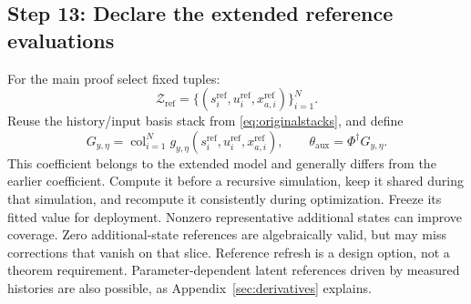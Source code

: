\documentclass[11pt,a4paper]{article}
\newcommand{\col}{\operatorname{col}}
\newcommand{\refset}{\mathrm{ref}}
\begin{document}
\subsection*{Step 13: Declare the extended reference evaluations}
For the main proof select fixed tuples:
\begin{equation}\label{eq:extendedreferences}
\mathcal Z_{\refset}=\{(s_i^{\refset},u_i^{\refset},x_{a,i}^{\refset})\}_{i=1}^N.
\end{equation}
Reuse the history/input basis stack from \eqref{eq:originalstacks}, and define
\begin{equation}\label{eq:extendedcoefficient}
G_{y,\eta}=\col_{i=1}^N g_{y,\eta}(s_i^{\refset},u_i^{\refset},x_{a,i}^{\refset}),
\qquad \theta_{\mathrm{aux}}=\Phi^\dagger G_{y,\eta}.
\end{equation}
This coefficient belongs to the extended model and generally differs from the earlier coefficient. Compute it before a recursive simulation, keep it shared during that simulation, and recompute it consistently during optimization. Freeze its fitted value for deployment.
Nonzero representative additional states can improve coverage. Zero additional-state references are algebraically valid, but may miss corrections that vanish on that slice. Reference refresh is a design option, not a theorem requirement. Parameter-dependent latent references driven by measured histories are also possible, as Appendix~\ref{sec:derivatives} explains.
\end{document}
